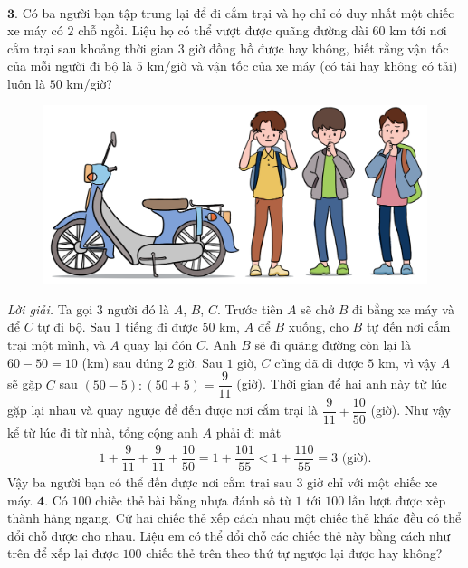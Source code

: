 \begin{multicols}{2}
\begin{align*}
	\end{align*}
	$\pmb{3.}$ Có ba người bạn tập trung lại để đi cắm trại và họ chỉ có duy nhất một chiếc xe máy có $2$ chỗ ngồi. Liệu họ có thể vượt được quãng đường dài $60$ km tới nơi cắm trại sau khoảng thời gian $3$ giờ đồng hồ được hay không, biết rằng vận tốc của mỗi người đi bộ là $5$ km/giờ và vận tốc của xe máy (có tải hay không có tải) luôn là $50$ km/giờ?
	\begin{figure}[H]
		\centering
		\vspace*{-15pt}
		\captionsetup{labelformat= empty, justification=centering}
		\includegraphics[width=0.95\linewidth]{Pi10_ToanBi_Bai3}
		\vspace*{-15pt}
	\end{figure}
	\textit{Lời giải.} 	Ta gọi $3$ người đó là $A$, $B$, $C$. Trước tiên $A$ sẽ chở $B$ đi bằng xe máy và để $C$ tự đi bộ. Sau $1$ tiếng đi được $50$ km, $A$ để $B$ xuống, cho $B$ tự đến nơi cắm trại một mình, và $A$ quay lại đón $C$. Anh $B$ sẽ đi quãng đường còn lại là $60 -50 =10$ (km) sau đúng $2$ giờ. Sau $1$ giờ, $C$ cũng đã đi được $5$ km, vì vậy $A$ sẽ gặp $C$ sau $(50-5):(50+5)= \dfrac{9}{11}$ (giờ). Thời gian để hai anh này từ lúc gặp lại nhau và quay ngược để đến được nơi cắm trại là $\dfrac{9}{11}+\dfrac{10}{50}$ (giờ).
	\vskip 0.1cm
	Như vậy kể từ lúc đi từ nhà, tổng cộng anh $A$ phải đi mất
	\begin{align*}
		1\!\!+\!\!\dfrac{9}{11}\!\!+\!\!  \dfrac{9}{11}\!\!+\!\!\dfrac{10}{50}  \!=\!\! 1\!\!+\!\!\dfrac{101}{55}\!\!<\!\!1\!\!+\!\!\dfrac{110}{55}\!=\!\!3  \text{ (giờ)}.
	\end{align*}
	Vậy ba người bạn có thể đến được nơi cắm trại sau $3$ giờ chỉ với một chiếc xe máy.
	\vskip 0.1cm
	$\pmb{4.}$ Có $100$ chiếc thẻ bài bằng nhựa đánh số từ $1$ tới $100$ lần lượt được xếp thành hàng ngang. Cứ hai chiếc thẻ xếp cách nhau một chiếc thẻ khác đều có thể đổi chỗ được cho nhau. Liệu em có thể đổi chỗ các chiếc thẻ này bằng cách như trên để xếp lại được $100$ chiếc thẻ trên theo thứ tự ngược lại được hay không?

\end{multicols}
